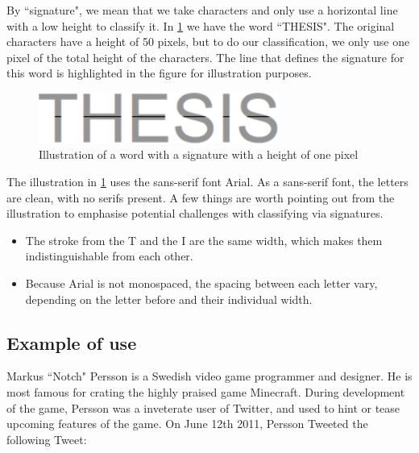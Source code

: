 By ``signature", we mean that we take characters and only use a horizontal line with a low height to classify it. In \ref{fig:thesis-signature} we have the word ``THESIS". The original characters have a height of 50 pixels, but to do our classification, we only use one pixel of the total height of the characters. The line that defines the signature for this word is highlighted in the figure for illustration purposes.

\begin{figure}[h]
    \centering
    \includegraphics[width=0.7\textwidth]{fig/chapter1/signature.png}
    \caption{Illustration of a word with a signature with a height of one pixel}
    \label{fig:thesis-signature}
\end{figure}

The illustration in \ref{fig:thesis-signature} uses the sans-serif font Arial\cite{misc-arial-font}. As a \gls{sans-serif} font, the letters are clean, with no \gls{serif}s present. A few things are worth pointing out from the illustration to emphasise potential challenges with classifying via signatures.

\begin{itemize}
    \item The stroke from the T and the I are the same width, which makes them indistinguishable from each other.
    \item Because Arial is not monospaced, the spacing between each letter vary, depending on the letter before and their individual width.
\end{itemize}

\subsection{Example of use}
Markus ``Notch" Persson is a Swedish video game programmer and designer. He is most famous for crating the highly praised game Minecraft. During development of the game, Persson was a inveterate user of Twitter, and used to hint or tease upcoming features of the game. On June 12th 2011, Persson Tweeted the following Tweet:

